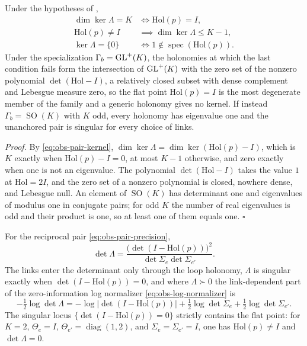 Under the hypotheses of ,
\begin{equation}
\begin{aligned}
\dim\ker\Lambda=K
&\iff\mathrm{Hol}(p)=I,\\
\mathrm{Hol}(p)\neq I
&\implies\dim\ker\Lambda\leq K-1,\\
\ker\Lambda=\{0\}
&\iff1\notin\operatorname{spec}(\mathrm{Hol}(p)).
\end{aligned}
\label{eq:obs-holonomy-kernel}
\end{equation}
Under the specialization \(\Gamma_b=\mathrm{GL}^+(K)\), the holonomies at which the last condition
fails form the intersection of \(\mathrm{GL}^+(K)\) with the zero set of the nonzero polynomial
\(\det(\mathrm{Hol}-I)\), a relatively closed subset with dense complement and Lebesgue measure
zero, so the flat point \(\mathrm{Hol}(p)=I\) is the most degenerate member of the family and a
generic holonomy gives no kernel. If instead \(\Gamma_b=\operatorname{SO}(K)\) with \(K\) odd,
every holonomy has eigenvalue one and the unanchored pair is singular for every choice of
links. 

\noindent\emph{Proof.}
By \eqref{eq:obs-pair-kernel}, \(\dim\ker\Lambda=\dim\ker(\mathrm{Hol}(p)-I)\), which is \(K\)
exactly when \(\mathrm{Hol}(p)-I=0\), at most \(K-1\) otherwise, and zero exactly when one is not
an eigenvalue. The polynomial \(\det(\mathrm{Hol}-I)\) takes the value \(1\) at
\(\mathrm{Hol}=2I\), and the zero set of a nonzero polynomial is closed, nowhere dense, and
Lebesgue null. An element of \(\operatorname{SO}(K)\) has determinant one and eigenvalues of
modulus one in conjugate pairs; for odd \(K\) the number of real eigenvalues is odd and their
product is one, so at least one of them equals one. \hfill$\square$

For the reciprocal pair \eqref{eq:obs-pair-precision},
\begin{equation}
\det\Lambda=\frac{\bigl(\det(I-\mathrm{Hol}(p))\bigr)^{2}}{\det\Sigma_e\det\Sigma_{e'}} .
\label{eq:obs-holonomy-det}
\end{equation}
The links enter the determinant only through the loop holonomy, \(\Lambda\) is singular exactly
when \(\det(I-\mathrm{Hol}(p))=0\), and where \(\Lambda\succ0\) the link-dependent part of the
zero-information log normalizer \eqref{eq:obs-log-normalizer} is
\begin{equation}
-\tfrac12\log\det\Lambda
=-\log\bigl\lvert\det(I-\mathrm{Hol}(p))\bigr\rvert
+\tfrac12\log\det\Sigma_e
+\tfrac12\log\det\Sigma_{e'} .
\label{eq:obs-holonomy-normalizer}
\end{equation}
The singular locus \(\{\det(I-\mathrm{Hol}(p))=0\}\) strictly contains the flat point: for
\(K=2\), \(\Theta_e=I\), \(\Theta_{e'}=\operatorname{diag}(1,2)\), and
\(\Sigma_e=\Sigma_{e'}=I\), one has \(\mathrm{Hol}(p)\neq I\) and \(\det\Lambda=0\).

